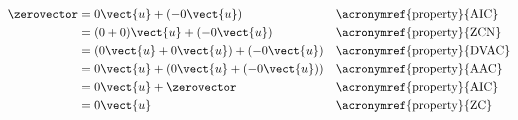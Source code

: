\begin{align*}
\zerovector
&= 0\vect{u} +(-0\vect{u})&&\text{\acronymref{property}{AIC}}\\
&= (0+0)\vect{u} + (-0\vect{u})&&\text{\acronymref{property}{ZCN}}\\
&= (0\vect{u}+0\vect{u}) + (-0\vect{u})&&\text{\acronymref{property}{DVAC}}\\
&= 0\vect{u} + (0\vect{u} + (-0\vect{u}))&&\text{\acronymref{property}{AAC}}\\
&= 0\vect{u} + \zerovector&&\text{\acronymref{property}{AIC}}\\
&= 0\vect{u}&&\text{\acronymref{property}{ZC}}
\end{align*}
